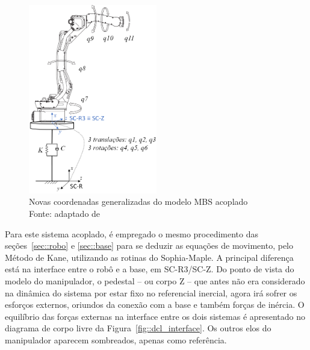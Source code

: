 \begin{figure}[h]
	\centering 
 	\includegraphics[width=0.50\textwidth]{figs/esq_acoplado}
 	\caption[Novas coordenadas generalizadas do modelo MBS acoplado]{Novas
 	coordenadas generalizadas do modelo MBS acoplado \\
 	Fonte: adaptado de}
 	\label{fig::esq_acoplado}
\end{figure}

Para este sistema acoplado, é empregado o mesmo procedimento das
seções~\ref{sec::robo} e \ref{sec::base} para se deduzir as equações de
movimento, pelo Método de Kane, utilizando as rotinas do Sophia-Maple. A
principal diferença está na interface entre o robô e a base, em SC-R3/SC-Z.
Do ponto de vista do modelo do manipulador, o pedestal -- ou corpo Z -- que
antes não era considerado na dinâmica do sistema por estar fixo no referencial
inercial, agora irá sofrer os esforços externos, oriundos da conexão com a base
e também forças de inércia. O equilíbrio das forças externas na interface entre
os dois sistemas é apresentado no diagrama de corpo livre da
Figura~\ref{fig::dcl_interface}. Os outros elos do manipulador aparecem
sombreados, apenas como referência.

